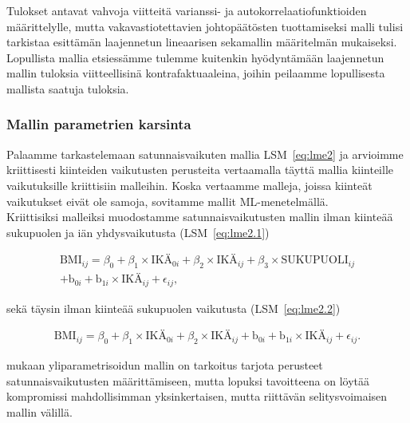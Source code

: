 \documentclass[finnish]{docopts}
\begin{document}
Tulokset antavat vahvoja viitteitä varianssi- ja autokorrelaatiofunktioiden määrittelylle, mutta vakavastiotettavien johtopäätösten tuottamiseksi malli tulisi tarkistaa \cite{pinheiro00} esittämän laajennetun lineaarisen sekamallin määritelmän mukaiseksi.\\

Lopullista mallia etsiessämme tulemme kuitenkin hyödyntämään laajennetun mallin tuloksia viitteellisinä kontrafaktuaaleina, joihin peilaamme lopullisesta mallista saatuja tuloksia.\\

\subsubsection{Mallin parametrien karsinta}
\label{ssb:malliparamkars}

Palaamme tarkastelemaan satunnaisvaikuten mallia LSM~\ref{eq:lme2} ja arvioimme kriittisesti kiinteiden vaikutusten perusteita vertaamalla täyttä mallia kiinteille vaikutuksille kriittisiin malleihin. Koska vertaamme malleja, joissa kiinteät vaikutukset eivät ole samoja, sovitamme mallit ML-menetelmällä.\\

Kriittisiksi malleiksi muodostamme satunnaisvaikutusten mallin ilman kiinteää sukupuolen ja iän yhdysvaikutusta (LSM~\ref{eq:lme2.1})

\begin{equation}
\begin{split}
 \text{BMI}_{ij} = \beta_0 + \beta_1 \times \text{IKÄ}_{0i} + \beta_2 \times \text{IKÄ}_{ij} + \beta_3 \times \text{SUKUPUOLI}_{ij}\\
 + \text{b}_{0i} + \text{b}_{1i} \times \text{IKÄ}_{ij} + \epsilon_{ij},
\label{eq:lme2.1}
\end{split}
\end{equation}

sekä täysin ilman kiinteää sukupuolen vaikutusta (LSM~\ref{eq:lme2.2})

\begin{equation}
\begin{split}
 \text{BMI}_{ij} = \beta_0 + \beta_1 \times \text{IKÄ}_{0i} + \beta_2 \times \text{IKÄ}_{ij} + \text{b}_{0i} + \text{b}_{1i} \times \text{IKÄ}_{ij} + \epsilon_{ij}.
\label{eq:lme2.2}
\end{split}
\end{equation}

\cite{west14} mukaan yliparametrisoidun mallin on tarkoitus tarjota perusteet satunnaisvaikutusten määrittämiseen, mutta lopuksi tavoitteena on löytää kompromissi mahdollisimman yksinkertaisen, mutta riittävän selitysvoimaisen mallin välillä.
\end{document}
